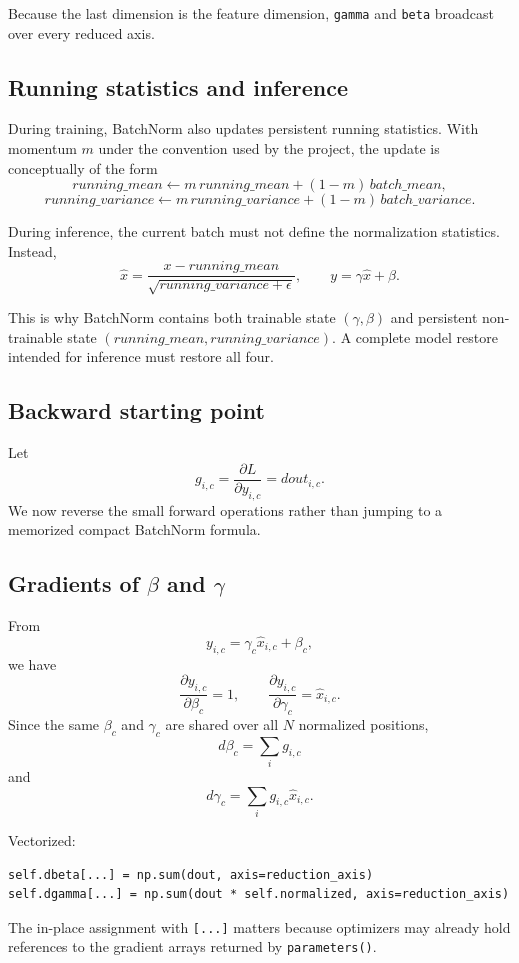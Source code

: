 \documentclass[11pt,a4paper]{article}
\newcommand{\pd}[2]{\frac{\partial #1}{\partial #2}}
\newcommand{\code}[1]{\texttt{#1}}
\begin{document}
Because the last dimension is the feature dimension, \code{gamma} and \code{beta} broadcast over every reduced axis.

\subsection{Running statistics and inference}

During training, BatchNorm also updates persistent running statistics. With momentum $m$ under the convention used by the project, the update is conceptually of the form
\[
running\_mean
\leftarrow
m\,running\_mean+(1-m)\,batch\_mean,
\]
\[
running\_variance
\leftarrow
m\,running\_variance+(1-m)\,batch\_variance.
\]

During inference, the current batch must not define the normalization statistics. Instead,
\[
\hat{x}
=
\frac{x-running\_mean}{\sqrt{running\_variance+\epsilon}},
\qquad
y=\gamma\hat{x}+\beta.
\]

This is why BatchNorm contains both trainable state $(\gamma,\beta)$ and persistent non-trainable state $(running\_mean,running\_variance)$. A complete model restore intended for inference must restore all four.

\subsection{Backward starting point}

Let
\[
g_{i,c}=\pd{L}{y_{i,c}}=dout_{i,c}.
\]
We now reverse the small forward operations rather than jumping to a memorized compact BatchNorm formula.

\subsection{Gradients of $\beta$ and $\gamma$}

From
\[
y_{i,c}=\gamma_c\hat{x}_{i,c}+\beta_c,
\]
we have
\[
\pd{y_{i,c}}{\beta_c}=1,
\qquad
\pd{y_{i,c}}{\gamma_c}=\hat{x}_{i,c}.
\]
Since the same $\beta_c$ and $\gamma_c$ are shared over all $N$ normalized positions,
\[
\boxed{
d\beta_c=\sum_i g_{i,c}}
\]
and
\[
\boxed{
d\gamma_c=\sum_i g_{i,c}\hat{x}_{i,c}}.
\]

Vectorized:
\begin{lstlisting}
self.dbeta[...] = np.sum(dout, axis=reduction_axis)
self.dgamma[...] = np.sum(dout * self.normalized, axis=reduction_axis)
\end{lstlisting}

The in-place assignment with \code{[...]} matters because optimizers may already hold references to the gradient arrays returned by \code{parameters()}.
\end{document}
